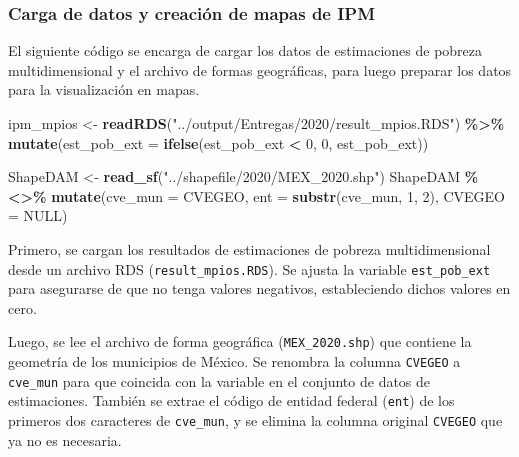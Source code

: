 \documentclass[
  12pt,
]{book}
\newenvironment{Shaded}{\begin{snugshade}}{\end{snugshade}}
\newcommand{\AttributeTok}[1]{\textcolor[rgb]{0.13,0.29,0.53}{#1}}
\newcommand{\ConstantTok}[1]{\textcolor[rgb]{0.56,0.35,0.01}{#1}}
\newcommand{\DecValTok}[1]{\textcolor[rgb]{0.00,0.00,0.81}{#1}}
\newcommand{\FunctionTok}[1]{\textcolor[rgb]{0.13,0.29,0.53}{\textbf{#1}}}
\newcommand{\NormalTok}[1]{#1}
\newcommand{\OtherTok}[1]{\textcolor[rgb]{0.56,0.35,0.01}{#1}}
\newcommand{\SpecialCharTok}[1]{\textcolor[rgb]{0.81,0.36,0.00}{\textbf{#1}}}
\newcommand{\StringTok}[1]{\textcolor[rgb]{0.31,0.60,0.02}{#1}}
\begin{document}
\hypertarget{carga-de-datos-y-creaciuxf3n-de-mapas-de-ipm}{%
\subsubsection*{Carga de datos y creación de mapas de IPM}\label{carga-de-datos-y-creaciuxf3n-de-mapas-de-ipm}}

El siguiente código se encarga de cargar los datos de estimaciones de pobreza multidimensional y el archivo de formas geográficas, para luego preparar los datos para la visualización en mapas.

\begin{Shaded}
\begin{Highlighting}[]
\NormalTok{ipm\_mpios }\OtherTok{\textless{}{-}} 
  \FunctionTok{readRDS}\NormalTok{(}\StringTok{"../output/Entregas/2020/result\_mpios.RDS"}\NormalTok{) }\SpecialCharTok{\%\textgreater{}\%} 
  \FunctionTok{mutate}\NormalTok{(}\AttributeTok{est\_pob\_ext =} \FunctionTok{ifelse}\NormalTok{(est\_pob\_ext }\SpecialCharTok{\textless{}} \DecValTok{0}\NormalTok{, }\DecValTok{0}\NormalTok{, est\_pob\_ext))}

\NormalTok{ShapeDAM }\OtherTok{\textless{}{-}} \FunctionTok{read\_sf}\NormalTok{(}\StringTok{"../shapefile/2020/MEX\_2020.shp"}\NormalTok{)}
\NormalTok{ShapeDAM }\SpecialCharTok{\%\textless{}\textgreater{}\%} \FunctionTok{mutate}\NormalTok{(}\AttributeTok{cve\_mun =}\NormalTok{ CVEGEO,}
                     \AttributeTok{ent =} \FunctionTok{substr}\NormalTok{(cve\_mun, }\DecValTok{1}\NormalTok{, }\DecValTok{2}\NormalTok{),}
                     \AttributeTok{CVEGEO =} \ConstantTok{NULL}\NormalTok{)}
\end{Highlighting}
\end{Shaded}

Primero, se cargan los resultados de estimaciones de pobreza multidimensional desde un archivo RDS (\texttt{result\_mpios.RDS}). Se ajusta la variable \texttt{est\_pob\_ext} para asegurarse de que no tenga valores negativos, estableciendo dichos valores en cero.

Luego, se lee el archivo de forma geográfica (\texttt{MEX\_2020.shp}) que contiene la geometría de los municipios de México. Se renombra la columna \texttt{CVEGEO} a \texttt{cve\_mun} para que coincida con la variable en el conjunto de datos de estimaciones. También se extrae el código de entidad federal (\texttt{ent}) de los primeros dos caracteres de \texttt{cve\_mun}, y se elimina la columna original \texttt{CVEGEO} que ya no es necesaria.
\end{document}
